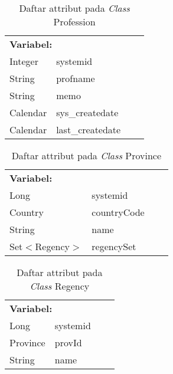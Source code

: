 \begin{table}[H]
	\caption{Daftar attribut pada \textit{Class} Profession}
	\centering
	\small
	\begin{adjustbox}{width=1\textwidth}	
		\begin{tabular}{|p{5cm} p{3.1cm} p{2cm} p{2.1cm}|}
			\hline
			\multicolumn{2}{|l}{\textbf{Variabel:}}&\multicolumn{2}{l|}{\textbf{}}\\
			Integer&systemid&&\\
			String&profname&&\\
			String&memo&&\\
			Calendar&sys\_createdate&&\\
			Calendar&last\_createdate&&\\
			\hline
		\end{tabular}
	\end{adjustbox}
\end{table}
\begin{table}[H]
	\caption{Daftar attribut pada \textit{Class} Province}
	\centering
	\small
	\begin{adjustbox}{width=1\textwidth}	
		\begin{tabular}{|p{5cm} p{3.1cm} p{2cm} p{2.1cm}|}
			\hline
			\multicolumn{2}{|l}{\textbf{Variabel:}}&\multicolumn{2}{l|}{\textbf{}}\\
			Long&systemid&&\\
			Country&countryCode&&\\
			String&name&&\\
			Set$<$Regency$>$&regencySet&&\\
			\hline
		\end{tabular}
	\end{adjustbox}
\end{table}
\begin{table}[H]
	\caption{Daftar attribut pada \textit{Class} Regency}
	\centering
	\small
	\begin{adjustbox}{width=1\textwidth}	
		\begin{tabular}{|p{5cm} p{3.1cm} p{2cm} p{2.1cm}|}
			\hline
			\multicolumn{2}{|l}{\textbf{Variabel:}}&\multicolumn{2}{l|}{\textbf{}}\\
			Long&systemid&&\\
			Province&provId&&\\
			String&name&&\\
			\hline
		\end{tabular}
	\end{adjustbox}
\end{table}
